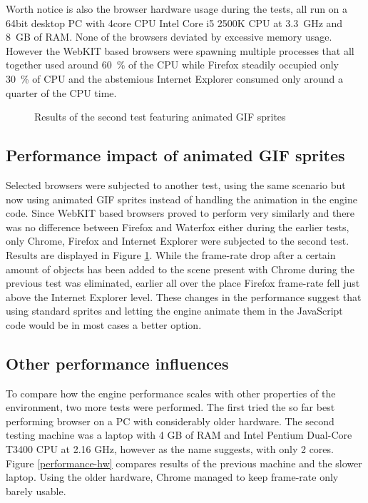 \documentclass[11pt,oneside, final]{fithesis2}
\begin{document}
Worth notice is also the browser hardware usage during the tests, all run on a 64bit desktop PC with 4core CPU Intel Core i5 2500K CPU at 3.3~GHz and 8~GB of RAM. None of the browsers deviated by excessive memory usage. However the WebKIT based browsers were spawning multiple processes that all together used around 60~\% of the CPU while Firefox steadily occupied only 30~\% of CPU and the abstemious Internet Explorer consumed only around a quarter of the CPU time.

\begin{figure}[h]
	\centering
	
	\caption{Results of the second test featuring animated GIF sprites}
	\label{performance-gif}
\end{figure}

\subsection{Performance impact of animated GIF sprites}
Selected browsers were subjected to another test, using the same scenario but now using animated GIF sprites instead of handling the animation in the engine code. Since WebKIT based browsers proved to perform very similarly and there was no difference between Firefox and Waterfox either during the earlier tests, only Chrome, Firefox and Internet Explorer were subjected to the second test. Results are displayed in Figure \ref{performance-gif}. While the frame-rate drop after a certain amount of objects has been added to the scene present with Chrome during the previous test was eliminated, earlier all over the place Firefox frame-rate fell just above the Internet Explorer level. These changes in the performance suggest that using standard sprites and letting the engine animate them in the JavaScript code would be in most cases a better option.

\subsection{Other performance influences}
To compare how the engine performance scales with other properties of the environment, two more tests were performed. The first tried the so far best performing browser on a PC with considerably older hardware. The second testing machine was a laptop with 4 GB of RAM and Intel Pentium Dual-Core T3400 CPU at 2.16 GHz, however as the name suggests, with only 2 cores. Figure \ref{performance-hw} compares results of the previous machine and the slower laptop. Using the older hardware, Chrome managed to keep frame-rate only barely usable.
\end{document}
